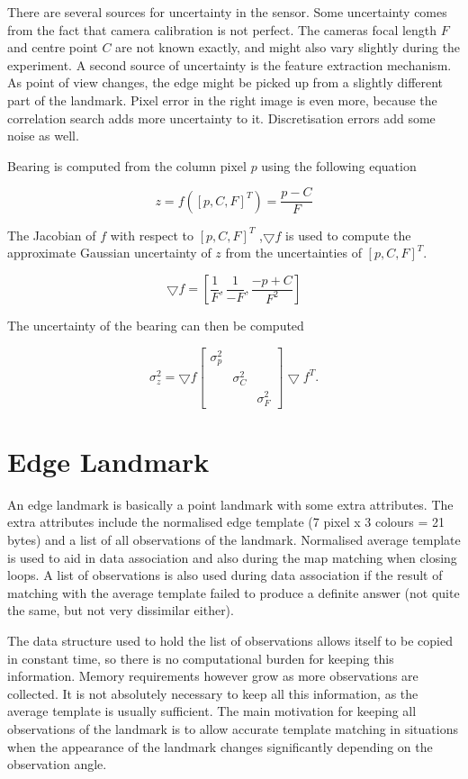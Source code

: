 There are several sources for uncertainty in the sensor. Some
uncertainty comes from the fact that camera calibration is not
perfect. The cameras focal length $F$ and centre point $C$ are not
known exactly, and might also vary slightly during the experiment. A
second source of uncertainty is the feature extraction mechanism. As
point of view changes, the edge might be picked up from a slightly
different part of the landmark. Pixel error in the right image is even
more, because the correlation search adds more uncertainty to it.
Discretisation errors add some noise as well.

Bearing is computed from the column pixel $p$ using the following equation

$$
z = f([p,C,F]^T) = \frac{p - C}{F}
$$

The Jacobian of $f$ with respect to $[p,C,F]^T$ ,$\bigtriangledown f$ is used to compute the
approximate Gaussian uncertainty of $z$ from the uncertainties of
$[p,C,F]^T$.

$$
\bigtriangledown f = \left[ 
\frac{1}{F},
\frac{1}{-F},
\frac{-p + C}{F^2}
\right]
$$

The uncertainty of the bearing can then be computed

$$
\sigma^2_z = \bigtriangledown f \left[ \begin{array}{ccc}
      \sigma^2_p & & \\
   &  \sigma^2_C & \\
  & & \sigma^2_F 
\end{array} \right] \bigtriangledown f^T.
$$



\section{Edge Landmark}

An edge landmark is basically a point landmark with some extra
attributes. The extra attributes include the normalised edge template
(7 pixel x 3 colours = 21 bytes) and a list of all observations of the
landmark.  Normalised average template is used to aid in data
association and also during the map matching when closing loops. A
list of observations is also used during data association if the
result of matching with the average template failed to produce a
definite answer (not quite the same, but not very dissimilar either).

The data structure used to hold the list of observations allows itself
to be copied in constant time, so there is no computational burden for
keeping this information. Memory requirements however grow as more
observations are collected. It is not absolutely necessary to keep all
this information, as the average template is usually sufficient. The
main motivation for keeping all observations of the landmark is to
allow accurate template matching in situations when the appearance of
the landmark changes significantly depending on the observation angle.

